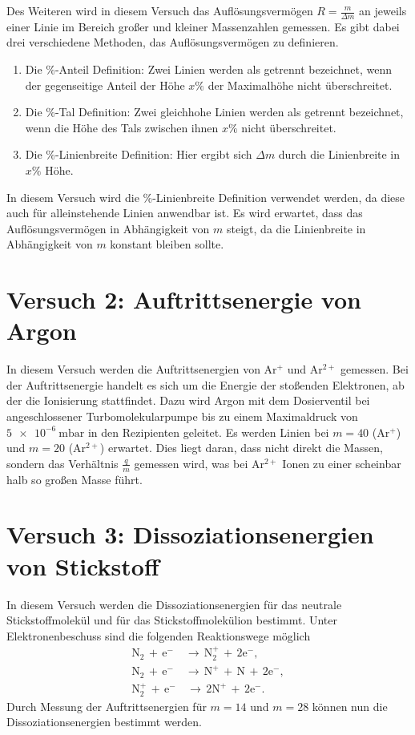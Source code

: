 Des Weiteren wird in diesem Versuch das Auflösungsvermögen $R=\frac{m}{\Delta m}$ an jeweils einer Linie im Bereich großer und kleiner Massenzahlen gemessen. Es gibt dabei drei verschiedene Methoden, das Auflösungsvermögen zu definieren.
\begin{enumerate}
 \item Die \%-Anteil Definition: Zwei Linien werden als getrennt bezeichnet, wenn der gegenseitige Anteil der Höhe $x\%$ der Maximalhöhe nicht überschreitet.
 \item Die \%-Tal Definition: Zwei gleichhohe Linien werden als getrennt bezeichnet, wenn die Höhe des Tals zwischen ihnen $x\%$ nicht überschreitet.
 \item Die \%-Linienbreite Definition: Hier ergibt sich $\Delta m$ durch die Linienbreite in $x\%$ Höhe.
\end{enumerate}
In diesem Versuch wird die \%-Linienbreite Definition verwendet werden, da diese auch für alleinstehende Linien anwendbar ist. Es wird erwartet, dass das Auflösungsvermögen in Abhängigkeit von $m$ steigt, da die Linienbreite in Abhängigkeit von $m$ konstant bleiben sollte.

\section{Versuch 2: Auftrittsenergie von Argon}

In diesem Versuch werden die Auftrittsenergien von Ar$^{+}$ und Ar$^{2+}$ gemessen. Bei der Auftrittsenergie handelt es sich um die Energie der stoßenden Elektronen, ab der die Ionisierung stattfindet.
Dazu wird Argon mit dem Dosierventil bei angeschlossener Turbomolekularpumpe bis zu einem Maximaldruck von $\SI{5e-6}{\milli\bar}$ in den Rezipienten geleitet. Es werden Linien bei $m=40$ (Ar$^{+}$) und $m=20$ (Ar$^{2+}$) erwartet. Dies liegt daran, dass nicht direkt die Massen, sondern das Verhältnis $\frac{q}{m}$ gemessen wird, was bei Ar$^{2+}$ Ionen zu einer scheinbar halb so großen Masse führt.

\section{Versuch 3: Dissoziationsenergien von Stickstoff}

In diesem Versuch werden die Dissoziationsenergien für das neutrale Stickstoffmolekül und für das Stickstoffmolekülion bestimmt. Unter Elektronenbeschuss sind die folgenden Reaktionswege möglich
\begin{align}
 \textrm{N}_{2} \, + \, \textrm{e}^{-} \, &\to \, \textrm{N}_{2}^{+} \, + \, 2\textrm{e}^{-}, \\
 \textrm{N}_{2} \, + \, \textrm{e}^{-} \, &\to \, \textrm{N}^{+} \, + \, \textrm{N} \, + \, 2\textrm{e}^{-}, \\
 \textrm{N}_{2}^{+} \, + \, \textrm{e}^{-} &\, \to \, 2\textrm{N}^{+} \, + \, 2\textrm{e}^{-}.
\end{align}
Durch Messung der Auftrittsenergien für $m=14$ und $m=28$ können nun die Dissoziationsenergien bestimmt werden.




